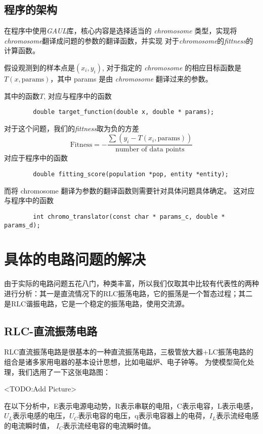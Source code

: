 \documentclass[a4paper]{article}
\begin{document}
\subsection{程序的架构}
在程序中使用\emph{GAUL}库，核心内容是选择适当的 \emph{chromosome}
类型，实现将\emph{chromosome}翻译成问题的参数的翻译函数，并实现
对于\emph{chromosome}的\emph{fittness}的计算函数。

假设观测到的样本点是$(x_i, y_i)$,
对于指定的 \emph{chromosome} 的相应目标函数是$T(x,
\text{params})$，其中
params 是由 \emph{chromosome} 翻译过来的参数。

其中的函数$T$, 对应与程序中的函数
\begin{verbatim}
        double target_function(double x, double * params);
\end{verbatim}

对于这个问题，我们的\emph{fittness}取为负的方差
\begin{equation}
	\text{Fitness} = - \frac{\sum (y_i - T(x_i, \text{params}))}{\text{number of data points}} 
\end{equation}
对应于程序中的函数
\begin{verbatim}
        double fitting_score(population *pop, entity *entity);
\end{verbatim}

而将 chromosome 翻译为参数的翻译函数则需要针对具体问题具体确定。
这对应与程序中的函数
\begin{verbatim}
        int chromo_translator(const char * params_c, double * params_d);
\end{verbatim}

\section{具体的电路问题的解决}
由于实际的电路问题五花八门，种类丰富，所以我们仅取其中比较有代表性的两种进行分析：其一是直流情况下的RLC振荡电路，它的振荡是一个暂态过程；其二是RLC谐振电路，它是一个稳定的振荡电路，使用交流源。
\subsection{RLC-直流振荡电路}
RLC直流振荡电路是很基本的一种直流振荡电路，三极管放大器+LC振荡电路的组合是诸多家用电器的基本设计思想，比如电磁炉、电子钟等。
为使模型简化处理，我们选用了一下这张电路图：

<TODO:Add Picture>

在以下分析中，E表示电源电动势，R表示串联的电阻，C表示电容，L表示电感，$U_L$表示电感的电压，$U_C$表示电容的电压，q表示电容器上的电荷，$I_L$表示流经电感的电流瞬时值，
$I_C$表示流经电容的电流瞬时值。
\end{document}
